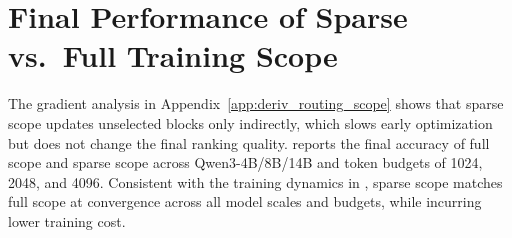 \section{Final Performance of Sparse vs.\ Full Training Scope}
\label{app:scope_final}
The gradient analysis in Appendix~\ref{app:deriv_routing_scope} shows that sparse scope updates unselected blocks only indirectly, which slows early optimization but does not change the final ranking quality.
 reports the final accuracy of full scope and sparse scope across Qwen3-4B/8B/14B and token budgets of 1024, 2048, and 4096.
Consistent with the training dynamics in , sparse scope matches full scope at convergence across all model scales and budgets, while incurring lower training cost.

\begin{table}[h]
\centering
\caption{Final accuracy (\%) of full training scope versus sparse training scope across model scales and token budgets. Standard deviations are shown in parentheses.}
\label{tab:scope_final}
\end{table}

